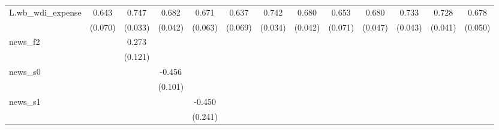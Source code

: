 {\begin{tabular}{l*{12}{c}}
\addlinespace
L.wb\_wdi\_expense&       0.643\sym{***}&       0.747\sym{***}&       0.682\sym{***}&       0.671\sym{***}&       0.637\sym{***}&       0.742\sym{***}&       0.680\sym{***}&       0.653\sym{***}&       0.680\sym{***}&       0.733\sym{***}&       0.728\sym{***}&       0.678\sym{***}\\
            &     (0.070)         &     (0.033)         &     (0.042)         &     (0.063)         &     (0.069)         &     (0.034)         &     (0.042)         &     (0.071)         &     (0.047)         &     (0.043)         &     (0.041)         &     (0.050)         \\
\addlinespace
news\_f2     &                     &       0.273\sym{**} &                     &                     &                     &                     &                     &                     &                     &                     &                     &                     \\
            &                     &     (0.121)         &                     &                     &                     &                     &                     &                     &                     &                     &                     &                     \\
\addlinespace
news\_s0     &                     &                     &      -0.456\sym{***}&                     &                     &                     &                     &                     &                     &                     &                     &                     \\
            &                     &                     &     (0.101)         &                     &                     &                     &                     &                     &                     &                     &                     &                     \\
\addlinespace
news\_s1     &                     &                     &                     &      -0.450\sym{*}  &                     &                     &                     &                     &                     &                     &                     &                     \\
            &                     &                     &                     &     (0.241)         &                     &                     &                     &                     &                     &                     &                     &                     \\

\end{tabular}}
